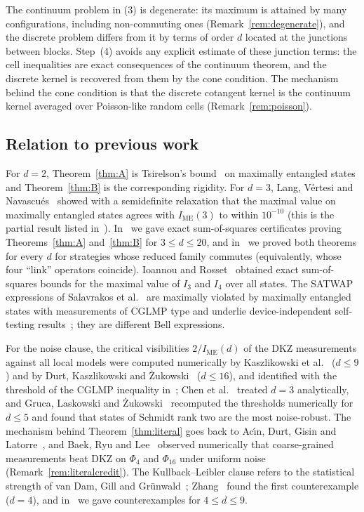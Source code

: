 \documentclass[11pt]{amsart}
\theoremstyle{definition}
\theoremstyle{remark}
\numberwithin{equation}{section}
\newcommand{\IME}{I_{\mathrm{ME}}}
\begin{document}
The continuum problem in (3) is degenerate: its maximum is attained by many configurations, including non-commuting
ones (Remark~\ref{rem:degenerate}), and the discrete problem differs from it by terms of order $d$ located at the
junctions between blocks. Step~(4) avoids any explicit estimate of these junction terms: the cell inequalities are
exact consequences of the continuum theorem, and the discrete kernel is recovered from them by the cone condition.
The mechanism behind the cone condition is that the discrete cotangent kernel is the continuum kernel averaged over
Poisson-like random cells (Remark~\ref{rem:poisson}).

\subsection{Relation to previous work}\label{subsec:previous}
For $d=2$, Theorem~\ref{thm:A} is Tsirelson's bound~\cite{Tsirelson} on maximally entangled states and
Theorem~\ref{thm:B} is the corresponding rigidity. For $d=3$, Lang, V\'ertesi and Navascu\'es~\cite{LVN} showed
with a semidefinite relaxation that the maximal value on maximally entangled states agrees with $\IME(3)$ to within
$10^{-10}$ (this is the partial result listed in~\cite{OQP}). In~\cite{repo-cglmp} we gave exact sum-of-squares
certificates proving Theorems~\ref{thm:A} and~\ref{thm:B} for $3\le d\le20$, and in~\cite{MS-classical} we proved
both theorems for every $d$ for strategies whose reduced family commutes (equivalently, whose four ``link''
operators coincide). Ioannou and Rosset~\cite{IR} obtained exact sum-of-squares bounds for the maximal value of $I_3$
and $I_4$ over all states. The SATWAP expressions of Salavrakos et al.~\cite{SATWAP} are maximally violated by
maximally entangled states with measurements of CGLMP type and underlie device-independent self-testing
results~\cite{SSKA}; they are different Bell expressions.

For the noise clause, the critical visibilities $2/\IME(d)$ of the DKZ measurements against all local models were
computed numerically by Kaszlikowski et al.~\cite{KGZMZ} ($d\le9$) and by Durt, Kaszlikowski and
\.Zukowski~\cite{DKZ} ($d\le16$), and identified with the threshold of the CGLMP inequality in~\cite[eq.~(23)]{CGLMP};
Chen et al.~\cite{Chen01} treated $d=3$ analytically, and Gruca, Laskowski and \.Zukowski~\cite{GLZ} recomputed the
thresholds numerically for $d\le5$ and found that states of Schmidt rank two are the most noise-robust. The mechanism
behind Theorem~\ref{thm:literal} goes back to Ac\'{\i}n, Durt, Gisin and Latorre~\cite{ADGL}, and Baek, Ryu and
Lee~\cite{BRL} observed numerically that coarse-grained measurements beat DKZ on $\Phi_4$ and $\Phi_{16}$ under uniform
noise (Remark~\ref{rem:literalcredit}). The Kullback--Leibler clause refers to the statistical strength of van Dam, Gill
and Gr\"unwald~\cite{vDGG}; Zhang~\cite{Zhang} found the first counterexample ($d=4$), and in~\cite{repo-cglmp} we gave
counterexamples for $4\le d\le9$.
\end{document}
